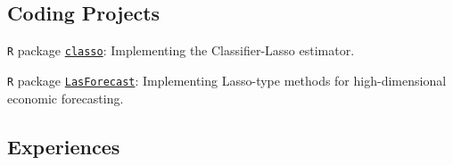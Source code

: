 \documentclass[letterpaper]{article}
\renewenvironment{itemize}{
  \begin{list}{}{
    \setlength{\leftmargin}{1.5em}
    \setlength{\itemsep}{0.25em}
    \setlength{\parskip}{0pt}
    \setlength{\parsep}{0.25em}
  }
}{
  \end{list}
}
\begin{document}

\subsection*{Coding Projects}

\begin{itemize}
  \item \texttt{R} package \href{https://github.com/zhan-gao/classo}{{\color{blue}\texttt{classo}}}: Implementing the Classifier-Lasso estimator.
  \item \texttt{R} package \href{https://github.com/zhan-gao/LasForecast}{{\color{blue}\texttt{LasForecast}}}: Implementing Lasso-type methods for high-dimensional economic forecasting.
\end{itemize}

\subsection*{Experiences}

\end{document}
